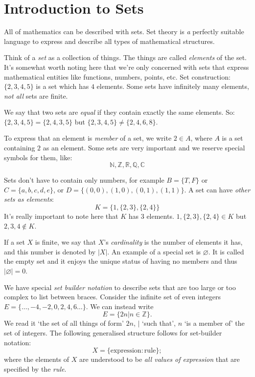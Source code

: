 \section{Introduction to Sets}

All of mathematics can be described with sets. Set theory is \emph{a} perfectly suitable language to express and describe all types of mathematical structures. 

Think of a \emph{set} as a collection of things. The things are called \emph{elements} of the set. It's somewhat worth noting here that we're only concerned with sets that express mathematical entities like functions, numbers, points, etc.
Set construction: $\{ 2, 3, 4, 5 \}$ is a set which has $4$ elements. Some sets have infinitely many elements, \emph{not all} sets are finite.

We say that two sets are \emph{equal} if they contain exactly the same elements. So: 
	$\{ 2,3,4,5 \}=\{ 2, 4,3,5 \}$ but $\{ 2,3,4,5 \}\neq\{ 2,4,6,8 \}$. 

To express that an element is \emph{member} of a set, we write $2\in A$, where $A$ is a set containing $2$ as an element. 
Some sets are very important and we reserve special symbols for them, like: 
$$
\mathbb{N,Z,R,Q,C}
$$  

Sets don't have to contain only numbers, for example $B=\{ T,F \}$ or $C=\{ a,b,c,d,e \}$, or $D=\{ (0,0), (1,0), (0,1), (1,1) \}$. A set can have \emph{other sets as elements}: 
$$
K=\{1, \{ 2,3 \}, \{ 2,4 \}  \}
$$
It's really important to note here that $K$ has $3$ elements. $1, \{ 2, 3 \}, \{ 2,4 \} \in K$ but $2, 3,4 \notin K$.

If a set $X$ is finite, we say that $X$'s \emph{cardinality} is the number of elements it has, and this number is denoted by $|X|$. 
An example of a special set is $\varnothing$. It is called the empty set and it enjoys the unique status of having no members and thus $|\varnothing|=0$. 

We have special \emph{set builder notation} to describe sets that are too large or too complex to list between braces. Consider the infinite set of even integers $E=\{ \dots,-4,-2,0,2,4,6 \dots \}$. We can instead write 
$$
E=\{ 2n|n\in\mathbb{Z} \}.
$$
We read it `the set of all things of form' $2n$, $|$ `such that', $n$ `is a member of' the set of integers. 
The following generalised structure follows for set-builder notation: 
$$X=\{ \mathrm{expression}: \mathrm{rule} \};$$
where the elements of $X$ are understood to be \emph{all values of expression} that are specified by the \emph{rule}. 

